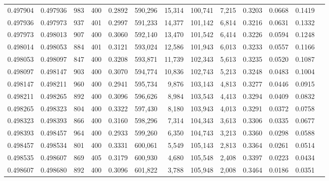 \begin{tabular}{rrrrrrrrrrrrr}
0.497904 & 0.497936 &   983 & 400 &                                     0.2892 & 590,296 &  15,314 & 100,741 &   7,215 & 0.3203 & 0.0668 & 0.1419 \\
0.497936 & 0.497973 &   937 & 401 &                                     0.2997 & 591,233 &  14,377 & 101,142 &   6,814 & 0.3216 & 0.0631 & 0.1332 \\
0.497973 & 0.498013 &   907 & 400 &                                     0.3060 & 592,140 &  13,470 & 101,542 &   6,414 & 0.3226 & 0.0594 & 0.1248 \\
0.498014 & 0.498053 &   884 & 401 &                                     0.3121 & 593,024 &  12,586 & 101,943 &   6,013 & 0.3233 & 0.0557 & 0.1166 \\
0.498053 & 0.498097 &   847 & 400 &                                     0.3208 & 593,871 &  11,739 & 102,343 &   5,613 & 0.3235 & 0.0520 & 0.1087 \\
0.498097 & 0.498147 &   903 & 400 &                                     0.3070 & 594,774 &  10,836 & 102,743 &   5,213 & 0.3248 & 0.0483 & 0.1004 \\
0.498147 & 0.498211 &   960 & 400 &                                     0.2941 & 595,734 &   9,876 & 103,143 &   4,813 & 0.3277 & 0.0446 & 0.0915 \\
0.498211 & 0.498265 &   892 & 400 &                                     0.3096 & 596,626 &   8,984 & 103,543 &   4,413 & 0.3294 & 0.0409 & 0.0832 \\
0.498265 & 0.498323 &   804 & 400 &                                     0.3322 & 597,430 &   8,180 & 103,943 &   4,013 & 0.3291 & 0.0372 & 0.0758 \\
0.498323 & 0.498393 &   866 & 400 &                                     0.3160 & 598,296 &   7,314 & 104,343 &   3,613 & 0.3306 & 0.0335 & 0.0677 \\
0.498393 & 0.498457 &   964 & 400 &                                     0.2933 & 599,260 &   6,350 & 104,743 &   3,213 & 0.3360 & 0.0298 & 0.0588 \\
0.498457 & 0.498534 &   801 & 400 &                                     0.3331 & 600,061 &   5,549 & 105,143 &   2,813 & 0.3364 & 0.0261 & 0.0514 \\
0.498535 & 0.498607 &   869 & 405 &                                     0.3179 & 600,930 &   4,680 & 105,548 &   2,408 & 0.3397 & 0.0223 & 0.0434 \\
0.498607 & 0.498680 &   892 & 400 &                                     0.3096 & 601,822 &   3,788 & 105,948 &   2,008 & 0.3464 & 0.0186 & 0.0351 \\

\end{tabular}
